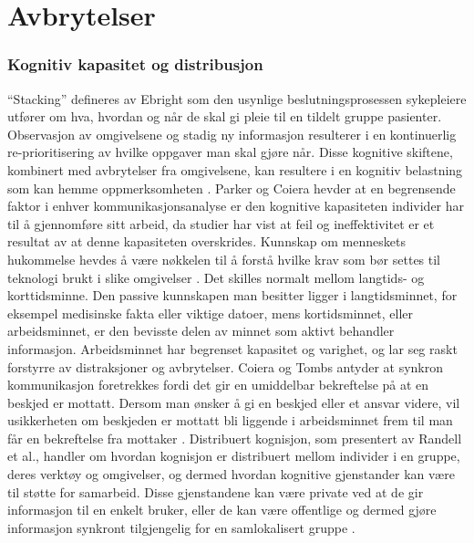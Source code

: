 \section{Avbrytelser}
\label{chp: avbrytelser} 

\subsubsection{Kognitiv kapasitet og distribusjon}
“Stacking” defineres av Ebright som den usynlige beslutningsprosessen sykepleiere utfører om hva, hvordan og når de skal gi pleie til en tildelt gruppe pasienter. Observasjon av omgivelsene og stadig ny informasjon resulterer i en kontinuerlig re-prioritisering av hvilke oppgaver man skal gjøre når. Disse kognitive skiftene, kombinert med avbrytelser fra omgivelsene, kan resultere i en kognitiv belastning som kan hemme oppmerksomheten \cite{Ebright10}. Parker og Coiera hevder at en begrensende faktor i enhver kommunikasjonsanalyse er den kognitive kapasiteten individer har til å gjennomføre sitt arbeid, da studier har vist at feil og ineffektivitet er et resultat av at denne kapasiteten overskrides. Kunnskap om menneskets hukommelse hevdes å være nøkkelen til å forstå hvilke krav som bør settes til teknologi brukt i slike omgivelser \cite{Parker00}.
Det skilles normalt mellom langtids- og korttidsminne. Den passive kunnskapen man besitter ligger i langtidsminnet, for eksempel medisinske fakta eller viktige datoer, mens kortidsminnet, eller arbeidsminnet, er den bevisste delen av minnet som aktivt behandler informasjon. Arbeidsminnet har begrenset kapasitet og varighet, og lar seg raskt forstyrre av distraksjoner og avbrytelser. Coiera og Tombs antyder at synkron kommunikasjon foretrekkes fordi det gir en umiddelbar bekreftelse på at en beskjed er mottatt. Dersom man ønsker å gi en beskjed eller et ansvar videre, vil usikkerheten om beskjeden er mottatt bli liggende i arbeidsminnet frem til man får en bekreftelse fra mottaker \cite{Parker00}. 
Distribuert kognisjon, som presentert av Randell et al., handler om hvordan kognisjon er distribuert mellom individer i en gruppe, deres verktøy og omgivelser, og dermed hvordan kognitive gjenstander kan være til støtte for samarbeid. Disse gjenstandene kan være private ved at de gir informasjon til en enkelt bruker, eller de kan være offentlige og dermed gjøre informasjon synkront tilgjengelig for en samlokalisert gruppe \cite{Randell}.  

